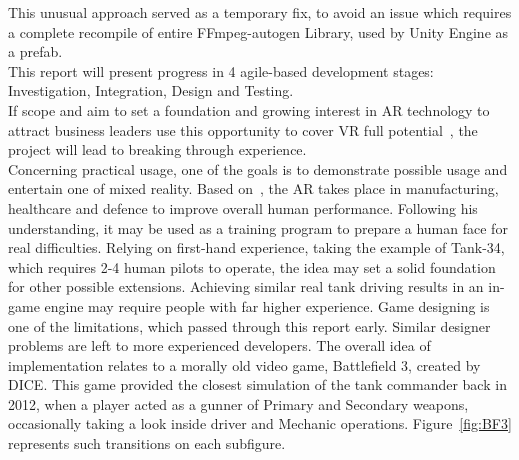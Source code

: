 This unusual approach served as a temporary fix, to avoid an issue which requires a complete recompile of entire FFmpeg-autogen Library, used by Unity Engine as a prefab.\\[1pt]
This report will present progress in 4 agile-based development stages: Investigation, Integration, Design and Testing. \\
If scope and aim to set a foundation and growing interest in AR technology to attract business leaders use this opportunity to cover VR full potential~\cite{jain_know_2017}, the project will lead to breaking through experience.\\[1pt]
Concerning practical usage, one of the goals is to demonstrate possible usage and entertain one of mixed reality.
Based on~\cite{abishur_prakash_augmented_2018}, the AR takes place in manufacturing, healthcare and defence to improve overall human performance.
Following his understanding, it may be used as a training program to prepare a human face for real difficulties.
Relying on first-hand experience, taking the example of Tank-34, which requires 2-4 human pilots to operate, the idea may set a solid foundation for other possible extensions.
Achieving similar real tank driving results in an in-game engine may require people with far higher experience.
Game designing is one of the limitations, which passed through this report early.
Similar designer problems are left to more experienced developers.
The overall idea of implementation relates to a morally old video game, Battlefield 3, created by DICE.
This game provided the closest simulation of the tank commander back in 2012, when a player acted as a gunner of Primary and Secondary weapons, occasionally taking a look inside driver and Mechanic operations.
Figure~\ref{fig:BF3} represents such transitions on each subfigure.
